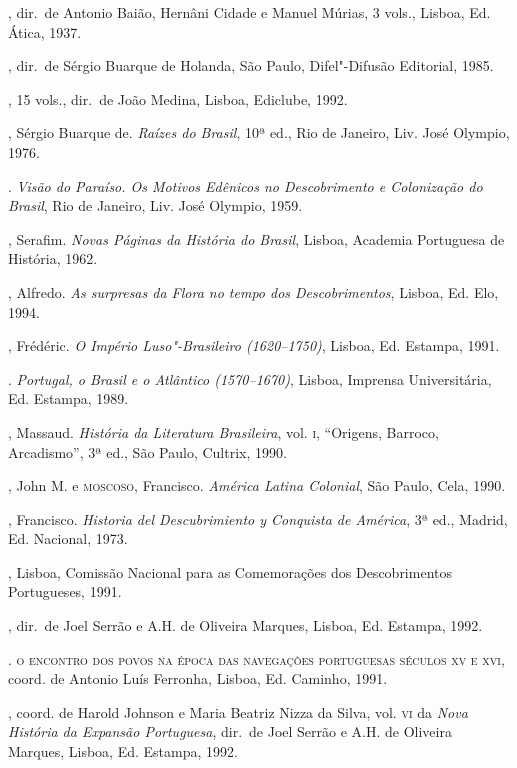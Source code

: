 \begin{bibliohedra}
, dir.~de Antonio
Baião, Hernâni Cidade e Manuel Múrias, 3 vols., Lisboa, Ed. Ática, 1937.

, dir.~de Sérgio
Buarque de Holanda, São Paulo, Difel"-Difusão Editorial, 1985.

, 15 vols., dir.~de João
Medina, Lisboa, Ediclube, 1992.

, Sérgio Buarque de. \textit{Raízes do Brasil}, 10ª ed., Rio de
Janeiro, Liv. José Olympio, 1976.

\titidem. \textit{Visão do Paraíso. Os Motivos
Edênicos no Descobrimento e Colonização do Brasil}, Rio de Janeiro,
Liv. José Olympio, 1959.

, Serafim. \textit{Novas Páginas da História do Brasil}, Lisboa,
Academia Portuguesa de História, 1962.

, Alfredo. \textit{As surpresas da Flora no tempo dos
Descobrimentos}, Lisboa, Ed. Elo, 1994.

, Frédéric. \textit{O Império Luso"-Brasileiro (1620--1750)}, 
Lisboa, Ed. Estampa, 1991.

\titidem. \textit{Portugal, o Brasil e o Atlântico (1570--1670)}, 
Lisboa, Imprensa Universitária, Ed. Estampa, 1989.

, Massaud. \textit{História da Literatura Brasileira}, vol. \textsc{i},
``Origens, Barroco, Arcadismo'', 3ª ed., São Paulo, Cultrix, 1990.

, John M. e \textsc{moscoso}, Francisco. \textit{América Latina
Colonial}, São Paulo, Cela, 1990.

, Francisco. \textit{Historia del Descubrimiento y
Conquista de América}, 3ª ed., Madrid, Ed. Nacional, 1973.

, Lisboa, Comissão
Nacional para as Comemorações dos Descobrimentos Portugueses, 1991.

, dir.~de Joel Serrão e
A.H. de Oliveira Marques, Lisboa, Ed. Estampa, 1992.

. \textsc{o encontro dos povos na época das
navegações portuguesas séculos xv e xvi}, coord. de Antonio Luís
Ferronha, Lisboa, Ed. Caminho, 1991.

, coord. de Harold
Johnson e Maria Beatriz Nizza da Silva, vol. \textsc{vi} da \textit{Nova
História da Expansão Portuguesa}, dir.~de Joel Serrão e A.H. de Oliveira
Marques, Lisboa, Ed. Estampa, 1992.


\end{bibliohedra}
